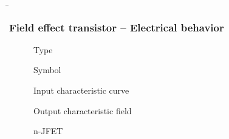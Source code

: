 \begin{frame}
    \b{ \frametitle{Field effect transistor -- Electrical behavior}
        \begin{table}[H]
            \begin{figure}[H]
                \begin{minipage}[c]{0.1\textwidth}
                    \centering
                    Type
                \end{minipage}
                \begin{minipage}[c]{0.2\textwidth}
                    \centering
                    Symbol
                \end{minipage}
                \begin{minipage}[c]{0.33\textwidth}
                    \centering
                    Input characteristic curve
                \end{minipage}
                \begin{minipage}[c]{0.33\textwidth}
                    \centering
                    Output characteristic field
                \end{minipage}
            \end{figure}
            \begin{figure}[H]
                \begin{minipage}[c]{0.1\textwidth}
                \centering
                n-JFET
                \end{minipage}
                \begin{minipage}[c]{0.2\textwidth}
                    \centering
                    
                    \end{minipage}
                \begin{minipage}[c]{0.33\textwidth}
                \centering
                  
                \end{minipage}
                \begin{minipage}[c]{0.33\textwidth}
                \centering
                
                \end{minipage}
            \end{figure}
            \begin{figure}[H]
                \begin{minipage}[c]{0.1\textwidth}

\end{minipage}
\end{figure}
\end{table}}
\end{frame}
